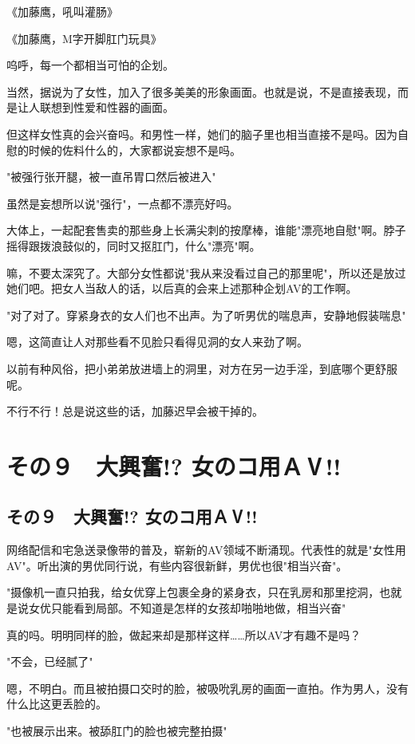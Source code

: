 \documentclass[12pt,UTF8]{ctexbook}
\begin{document}
{{《加藤鹰，吼叫灌肠》

《加藤鹰，M字开脚肛门玩具》

呜呼，每一个都相当可怕的企划。

当然，据说为了女性，加入了很多美美的形象画面。也就是说，不是直接表现，而是让人联想到性爱和性器的画面。

但这样女性真的会兴奋吗。和男性一样，她们的脑子里也相当直接不是吗。因为自慰的时候的佐料什么的，大家都说妄想不是吗。

"被强行张开腿，被一直吊胃口然后被进入"

虽然是妄想所以说"强行"，一点都不漂亮好吗。

大体上，一起配套售卖的那些身上长满尖刺的按摩棒，谁能"漂亮地自慰"啊。脖子摇得跟拨浪鼓似的，同时又抠肛门，什么"漂亮"啊。

嘛，不要太深究了。大部分女性都说"我从来没看过自己的那里呢"，所以还是放过她们吧。把女人当敌人的话，以后真的会来上述那种企划AV的工作啊。

"对了对了。穿紧身衣的女人们也不出声。为了听男优的喘息声，安静地假装喘息"

嗯，这简直让人对那些看不见脸只看得见洞的女人来劲了啊。

以前有种风俗，把小弟弟放进墙上的洞里，对方在另一边手淫，到底哪个更舒服呢。

不行不行！总是说这些的话，加藤迟早会被干掉的。
}

\chapter{その９　大興奮!? 女のコ用ＡⅤ!!}
\label{chap:09}
\section{その９　大興奮!? 女のコ用ＡⅤ!!}

网络配信和宅急送录像带的普及，崭新的AV领域不断涌现。代表性的就是"女性用AV"。听出演的男优同行说，有些内容很新鲜，男优也很"相当兴奋"。

"摄像机一直只拍我，给女优穿上包裹全身的紧身衣，只在乳房和那里挖洞，也就是说女优只能看到局部。不知道是怎样的女孩却啪啪地做，相当兴奋"

真的吗。明明同样的脸，做起来却是那样这样……所以AV才有趣不是吗？

"不会，已经腻了"

嗯，不明白。而且被拍摄口交时的脸，被吸吮乳房的画面一直拍。作为男人，没有什么比这更丢脸的。

"也被展示出来。被舔肛门的脸也被完整拍摄"

}
\end{document}
